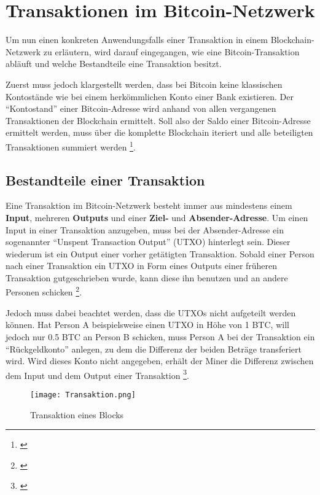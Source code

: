 \chapter{Transaktionen im Bitcoin-Netzwerk}\label{chp:transaktion-im-bitcoin-netzwerk}
Um nun einen konkreten Anwendungsfalls einer Transaktion in einem Blockchain-Netzwerk zu erläutern, wird darauf eingegangen, wie eine Bitcoin-Transaktion abläuft und welche Bestandteile eine Transaktion besitzt.

Zuerst muss jedoch klargestellt werden, dass bei Bitcoin keine klassischen Kontostände wie bei einem herkömmlichen Konto einer Bank existieren. Der ``Kontostand'' einer Bitcoin-Adresse wird anhand von allen vergangenen Transaktionen der Blockchain ermittelt. Soll also der Saldo einer Bitcoin-Adresse ermittelt werden, muss über die komplette Blockchain iteriert und alle beteiligten Transaktionen summiert werden \footnote{\parencite[vgl.][]{BTCACADEMY.08.03.2021}}.

\section{Bestandteile einer Transaktion}\label{sec:bestandteile-einer-transaktion}
Eine Transaktion im Bitcoin-Netzwerk besteht immer aus mindestens einem \textbf{Input}, mehreren \textbf{Outputs} und einer \textbf{Ziel-} und \textbf{Absender-Adresse}. Um einen Input in einer Transaktion anzugeben, muss bei der Absender-Adresse ein sogenannter ``Unspent Transaction Output'' (UTXO) hinterlegt sein. Dieser wiederum ist ein Output einer vorher getätigten Transaktion. Sobald einer Person nach einer Transaktion ein UTXO in Form eines Outputs einer früheren Transaktion gutgeschrieben wurde, kann diese ihn benutzen und an andere Personen schicken \footnote{\parencite[vgl.][]{entwickler.de.NaN}}. 

Jedoch muss dabei beachtet werden, dass die UTXOs nicht aufgeteilt werden können. Hat Person A beispielsweise einen UTXO in Höhe von 1 BTC, will jedoch nur 0.5 BTC an Person B schicken, muss Person A bei der Transaktion ein ``Rückgeldkonto'' anlegen, zu dem die Differenz der beiden Beträge transferiert wird. Wird dieses Konto nicht angegeben, erhält der Miner die Differenz zwischen dem Input und dem Output einer Transaktion \footnote{\parencite[vgl.][]{BTCACADEMY.08.03.2021}}. 

\begin{figure}[h]
    \begin{centering}
        \texttt{[image: Transaktion.png]}
        \caption[Transaktion eines Blocks]{Transaktion eines Blocks \footnotemark}
        \label{fig:transaktion}
    \end{centering}
\end{figure}

